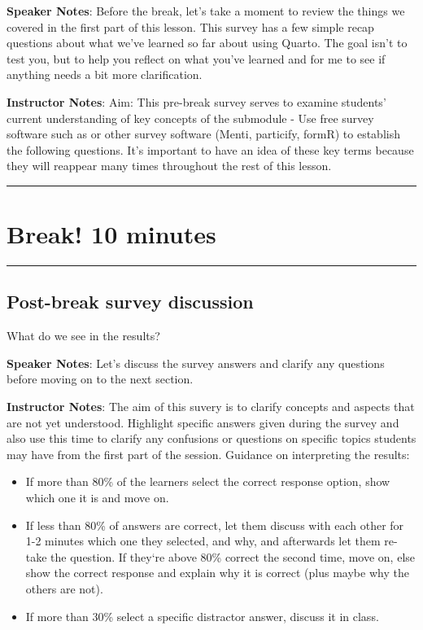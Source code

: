 \documentclass[
  letterpaper,
  DIV=11,
  numbers=noendperiod]{scrartcl}
\begin{document}
\textbf{Speaker Notes}: Before the break, let's take a moment to review
the things we covered in the first part of this lesson. This survey has
a few simple recap questions about what we've learned so far about using
Quarto. The goal isn't to test you, but to help you reflect on what
you've learned and for me to see if anything needs a bit more
clarification.

\textbf{Instructor Notes}: Aim: This pre-break survey serves to examine
students' current understanding of key concepts of the submodule - Use
free survey software such as or other survey software (Menti, particify,
formR) to establish the following questions. It's important to have an
idea of these key terms because they will reappear many times throughout
the rest of this lesson.

\begin{center}\rule{0.5\linewidth}{0.5pt}\end{center}

\section{Break! 10 minutes}\label{break-10-minutes}

\begin{center}\rule{0.5\linewidth}{0.5pt}\end{center}

\subsection{Post-break survey
discussion}\label{post-break-survey-discussion}

What do we see in the results?

\textbf{Speaker Notes}: Let's discuss the survey answers and clarify any
questions before moving on to the next section.

\textbf{Instructor Notes}: The aim of this suvery is to clarify concepts
and aspects that are not yet understood. Highlight specific answers
given during the survey and also use this time to clarify any confusions
or questions on specific topics students may have from the first part of
the session. Guidance on interpreting the results:

\begin{itemize}
\item
  If more than 80\% of the learners select the correct response option,
  show which one it is and move on.
\item
  If less than 80\% of answers are correct, let them discuss with each
  other for 1-2 minutes which one they selected, and why, and afterwards
  let them re-take the question. If they`re above 80\% correct the
  second time, move on, else show the correct response and explain why
  it is correct (plus maybe why the others are not).
\item
  If more than 30\% select a specific distractor answer, discuss it in
  class.
\end{itemize}
\end{document}
